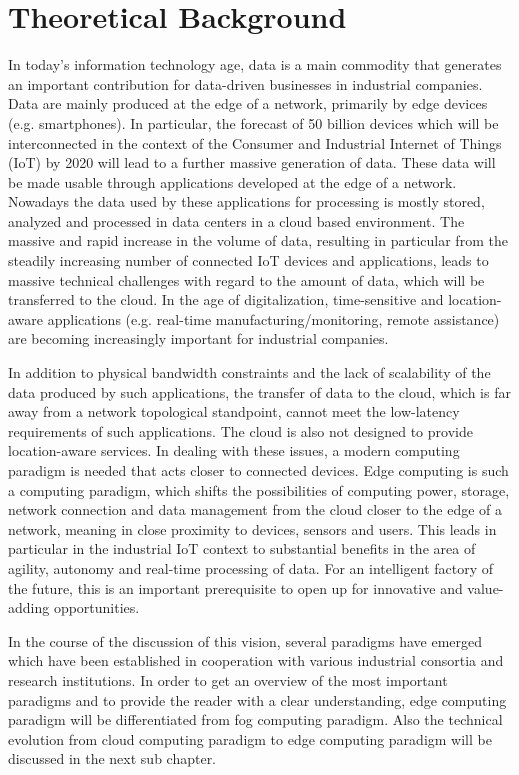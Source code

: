 \section{Theoretical Background}\label{sec:background}

In today's information technology age, data is a main commodity that generates an important contribution for data-driven businesses in industrial companies. Data are mainly produced at the edge of a network, primarily by edge devices (e.g. smartphones). In particular, the forecast of 50 billion devices which will be interconnected in the context of the Consumer and Industrial Internet of Things (IoT) by 2020 will lead to a further massive generation of data. These data will be made usable through applications developed at the edge of a network. Nowadays the data used by these applications for processing is mostly stored, analyzed and processed in data centers in a cloud based environment. The massive and rapid increase in the volume of data, resulting in particular from the steadily increasing number of connected IoT devices and applications, leads to massive technical challenges with regard to the amount of data, which will be transferred to the cloud. In the age of digitalization, time-sensitive and location-aware applications (e.g. real-time manufacturing/monitoring, remote assistance) are becoming increasingly important for industrial companies.\par
In addition to physical bandwidth constraints and the lack of scalability of the data produced by such applications, the transfer of data to the cloud, which is far away from a network topological standpoint, cannot meet the low-latency requirements of such applications. The cloud is also not designed to provide location-aware services. In dealing with these issues, a modern computing paradigm is needed that acts closer to connected devices. Edge computing is such a computing paradigm, which shifts the possibilities of computing power, storage, network connection and data management from the cloud closer to the edge of a network, meaning in close proximity to devices, sensors and users.
 This leads in particular in the industrial IoT context to substantial benefits in the area of agility, autonomy and real-time processing of data. For an intelligent factory of the future, this is an important prerequisite to open up for innovative and value-adding opportunities.\par 
In the course of the discussion of this vision, several paradigms have emerged which have been established in cooperation with various industrial consortia and research institutions. In order to get an overview of the most important paradigms and to provide the reader with a clear understanding, edge computing paradigm will be differentiated from fog computing paradigm. Also the technical evolution from cloud computing paradigm to edge computing paradigm will be discussed in the next sub chapter.

